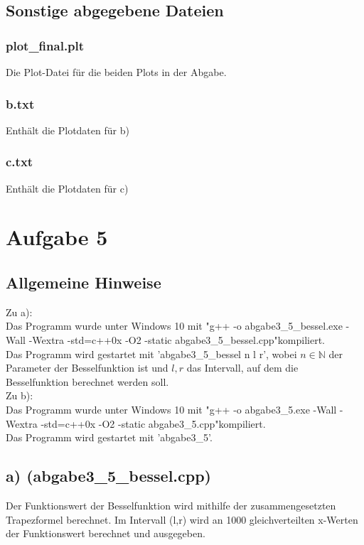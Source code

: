 \documentclass{scrreprt}
\begin{document}
\section*{Sonstige abgegebene Dateien}
\subsection*{plot\_final.plt}
Die Plot-Datei für die beiden Plots in der Abgabe.
\subsection*{b.txt}
Enthält die Plotdaten für b)
\subsection*{c.txt}
Enthält die Plotdaten für c)

\chapter*{Aufgabe 5}
\section*{Allgemeine Hinweise}
Zu a):\\
Das Programm wurde unter Windows 10 mit "g++ -o abgabe3\_5\_bessel.exe -Wall -Wextra -std=c++0x -O2 -static abgabe3\_5\_bessel.cpp"\;kompiliert.\\
Das Programm wird gestartet mit 'abgabe3\_5\_bessel n l r', wobei $n \in \mathbb{N}$ der Parameter der Besselfunktion ist und $l,r$ das Intervall, auf dem die Besselfunktion berechnet werden soll.\\

Zu b):\\
Das Programm wurde unter Windows 10 mit "g++ -o abgabe3\_5.exe -Wall -Wextra -std=c++0x -O2 -static abgabe3\_5.cpp"\;kompiliert.\\
Das Programm wird gestartet mit 'abgabe3\_5'. 

\section*{a) (abgabe3\_5\_bessel.cpp)}
Der Funktionswert der Besselfunktion wird mithilfe der zusammengesetzten Trapezformel berechnet. Im Intervall (l,r) wird an 1000 gleichverteilten x-Werten der Funktionswert berechnet und ausgegeben.
\end{document}
